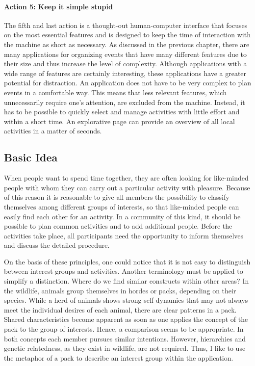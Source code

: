 \documentclass[12pt,numbers=noenddot,parskip,bibliography=totocnumbered,listof=totocnumbered,draft=true]{scrreprt}
\begin{document}
\paragraph{Action 5: Keep it simple stupid}
The fifth and last action is a thought-out human-computer interface that focuses on the most essential features and is designed to keep the time of interaction with the machine as short as necessary. As discussed in the previous chapter, there are many applications for organizing events that have many different features due to their size and thus increase the level of complexity. Although applications with a wide range of features are certainly interesting, these applications have a greater potential for distraction. An application does not have to be very complex to plan events in a comfortable way. \newline
This means that less relevant features, which unnecessarily require one's attention, are excluded from the machine. Instead, it has to be possible to quickly select and manage activities with little effort and within a short time. An explorative page can provide an overview of all local activities in a matter of seconds.

\subsection{Basic Idea}
When people want to spend time together, they are often looking for like-minded people with whom they can carry out a particular activity with pleasure. Because of this reason it is reasonable to give all members the possibility to classify themselves among different groups of interests, so that like-minded people can easily find each other for an activity. In a community of this kind, it should be possible to plan common activities and to add additional people. Before the activities take place, all participants need the opportunity to inform themselves and discuss the detailed procedure. 

On the basis of these principles, one could notice that it is not easy to distinguish between interest groups and activities. Another terminology must be applied to simplify a distinction. Where do we find similar constructs within other areas? In the wildlife, animals group themselves in hordes or packs, depending on their species. While a herd of animals shows strong self-dynamics that may not always meet the individual desires of each animal, there are clear patterns in a pack. Shared characteristics become apparent as soon as one applies the concept of the pack to the group of interests. Hence, a comparison seems to be appropriate. In both concepts each member pursues similar intentions. However, hierarchies and genetic relatedness, as they exist in wildlife, are not required. Thus, I like to use the metaphor of a pack to describe an interest group within the application.
\end{document}
